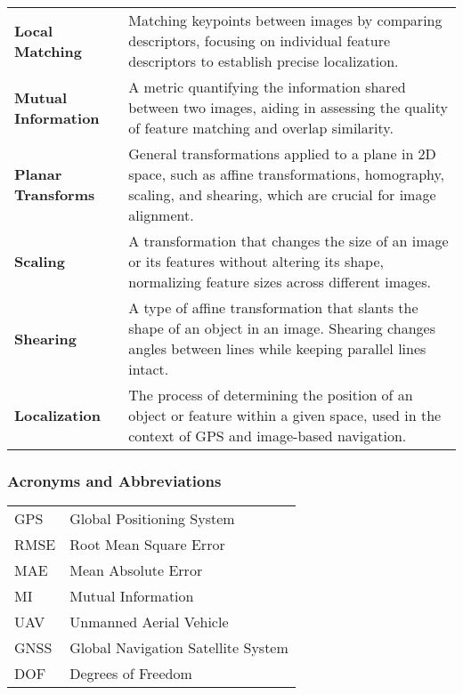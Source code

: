 \begin{tabularx}{\textwidth}{@{}p{2.5cm}L}
    \textbf{Local Matching} & 
    Matching keypoints between images by comparing descriptors, focusing on individual feature descriptors to establish precise localization. \\

    \textbf{Mutual Information} & 
    A metric quantifying the information shared between two images, aiding in assessing the quality of feature matching and overlap similarity. \\

    \textbf{Planar Transforms} & 
    General transformations applied to a plane in 2D space, such as affine transformations, homography, scaling, and shearing, which are crucial for image alignment. \\

    \textbf{Scaling} & 
    A transformation that changes the size of an image or its features without altering its shape, normalizing feature sizes across different images. \\

    \textbf{Shearing} & 
    A type of affine transformation that slants the shape of an object in an image. Shearing changes angles between lines while keeping parallel lines intact. \\

    \textbf{Localization} & 
    The process of determining the position of an object or feature within a given space, used in the context of GPS and image-based navigation. \\

\end{tabularx}
\endgroup

\newpage
\subsubsection*{Acronyms and Abbreviations}

\begingroup
\renewcommand{\arraystretch}{1.2}
\begin{tabular}{@{}p{2.5cm} l}
    GPS     & Global Positioning System \\
    RMSE    & Root Mean Square Error \\
    MAE     & Mean Absolute Error \\
    MI      & Mutual Information \\
    UAV     & Unmanned Aerial Vehicle \\
    GNSS    & Global Navigation Satellite System \\
    DOF     & Degrees of Freedom \\
\end{tabular}
\endgroup
